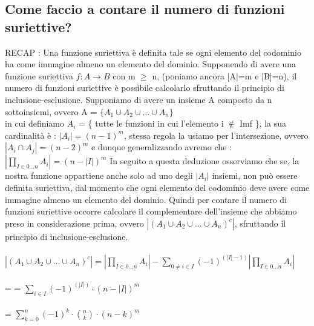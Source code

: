 \documentclass[a4paper,12pt]{report}
\begin{document}
	\subsection{Come faccio a contare il numero di funzioni suriettive?}
	RECAP : Una funzione suriettiva è definita tale se ogni elemento del codominio ha come immagine almeno un elemento del dominio.
	Supponendo di avere una funzione suriettiva $f:A \rightarrow B$ con m $\geq$ n, (poniamo ancora |A|=m e |B|=n), il numero di funzioni suriettive è possibile calcolarlo sfruttando il principio di inclusione-esclusione.
	Supponiamo di avere un insieme A composto da n sottoinsiemi, ovvero A = $\{A_1 \cup A_2 \cup ... \cup A_n\}$ \\ in cui definiamo $A_i$ = \{ tutte le funzioni in cui l'elemento i $\notin$ Imf \}, la sua cardinalità è : $|A_i| = (n - 1)^m$, stessa regola la usiamo per l'intersezione, ovvero $|A_i \cap A_j| = (n - 2)^m$ e dunque generalizzando avremo che : \\ $|\prod_{I \in {0...n}}A_i| = (n - |I|)^m$ In seguito a questa deduzione osserviamo che se, la nostra funzione appartiene anche solo ad uno degli $|A_i|$ insiemi, non può essere definita suriettiva, dal momento che ogni elemento del codominio deve avere come immagine almeno un elemento del dominio. Quindi per contare il numero di funzioni suriettive occorre calcolare  il complementare dell'insieme che abbiamo preso in considerazione prima, ovvero $|(A_1 \cup A_2 \cup ... \cup A_n)^c|$, sfruttando il principio di inclusione-esclusione. \\ \\
	 $|(A_1 \cup A_2 \cup ... \cup A_n)^c| = |\prod_{I \in {0...n}}A_i| - \sum_{0 \neq i \in I}(-1)^{(|I| - 1)}|\prod_{I \in {0...n}}A_i|$ \\ \\
	 = 
	 = $\sum_{i \in I}(-1)^{(|I|)} \cdot (n - |I|)^m$ \\ \\
	 = $\sum_{k = 0}^{n}(-1)^k \cdot \binom{n}{k} \cdot (n - k)^m$
	 
	 
	
\end{document}
